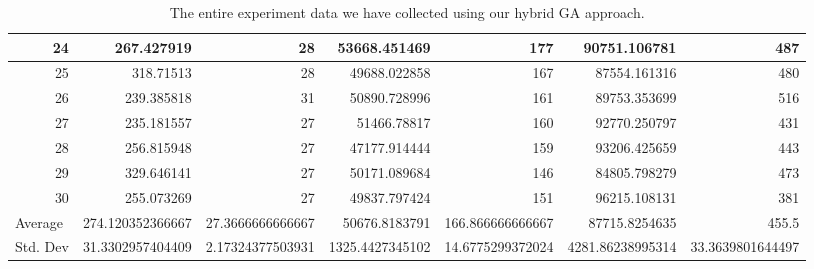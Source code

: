 \begin{table}
\begin{adjustwidth}{}{}
{{\begin{tabular}{|r|r|r|r|r|r|r|}
\hline
24                                         & 267.427919                   & 28                                    & 53668.451469                   & 177                                   & 90751.106781                 & 487                                    \\ 
\hline
25                                         & 318.71513                    & 28                                    & 49688.022858                   & 167                                   & 87554.161316                 & 480                                    \\ 
\hline
26                                         & 239.385818                   & 31                                    & 50890.728996                   & 161                                   & 89753.353699                 & 516                                    \\ 
\hline
27                                         & 235.181557                   & 27                                    & 51466.78817                    & 160                                   & 92770.250797                 & 431                                    \\ 
\hline
28                                         & 256.815948                   & 27                                    & 47177.914444                   & 159                                   & 93206.425659                 & 443                                    \\ 
\hline
29                                         & 329.646141                   & 27                                    & 50171.089684                   & 146                                   & 84805.798279                 & 473                                    \\ 
\hline
30                                         & 255.073269                   & 27                                    & 49837.797424                   & 151                                   & 96215.108131                 & 381                                    \\ 
\hline
\multicolumn{1}{|l|}{Average}              & 274.120352366667             & 27.3666666666667                      & 50676.8183791                  & 166.866666666667                      & 87715.8254635                & 455.5                                  \\ 
\hline
\multicolumn{1}{|l|}{Std. Dev}             & 31.3302957404409             & 2.17324377503931                      & 1325.4427345102                & 14.6775299372024                      & 4281.86238995314             & 33.3639801644497                       \\
\hline
\end{tabular}}}
\end{adjustwidth}
\caption{The entire experiment data we have collected using our hybrid GA approach.}
\label{full-data-ga}
\end{table}

